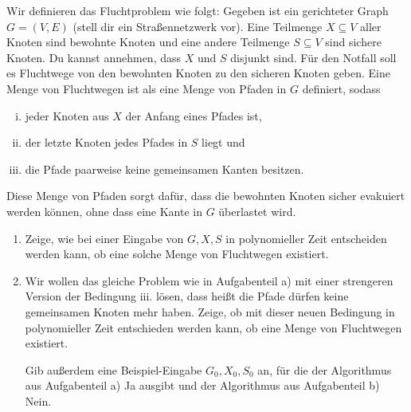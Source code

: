 \documentclass{uebung_cs}
\begin{document}
\begin{aufgabe}[Fluchtwege]
    Wir definieren das Fluchtproblem wie folgt: Gegeben ist ein gerichteter Graph $G = (V,E)$ (stell dir ein Straßennetzwerk vor). Eine Teilmenge $X \subseteq V$ aller Knoten sind bewohnte Knoten und eine andere Teilmenge $S \subseteq V$ sind sichere Knoten. Du kannst annehmen, dass $X$ und $S$ disjunkt sind. Für den Notfall soll es Fluchtwege von den bewohnten Knoten zu den sicheren Knoten geben. Eine Menge von Fluchtwegen ist als eine Menge von Pfaden in $G$ definiert, sodass
    \begin{enumerate}[i.]
      \item jeder Knoten aus $X$ der Anfang eines Pfades ist,
      \item der letzte Knoten jedes Pfades in $S$ liegt und
      \item die Pfade paarweise keine gemeinsamen Kanten besitzen.   
    \end{enumerate}
    Diese Menge von Pfaden sorgt dafür, dass die bewohnten Knoten sicher evakuiert werden können, ohne dass eine Kante in $G$ überlastet wird.
    \begin{enumerate}
    	\item Zeige, wie bei einer Eingabe von $G, X, S$ in polynomieller Zeit entscheiden werden kann, ob eine solche Menge von Fluchtwegen existiert.
    	\item Wir wollen das gleiche Problem wie in Aufgabenteil a) mit einer strengeren Version der Bedingung iii. lösen, dass heißt die Pfade dürfen keine gemeinsamen Knoten mehr haben.
    	Zeige, ob mit dieser neuen Bedingung in polynomieller Zeit entschieden werden kann, ob eine Menge von Fluchtwegen existiert.
    	
    	Gib außerdem eine Beispiel-Eingabe $G_0, X_0, S_0$ an, für die der Algorithmus aus Aufgabenteil a) \glqq Ja\grqq{} ausgibt und der Algorithmus aus Aufgabenteil b) \glqq Nein\grqq.
    \end{enumerate}
\end{aufgabe}
\end{document}
